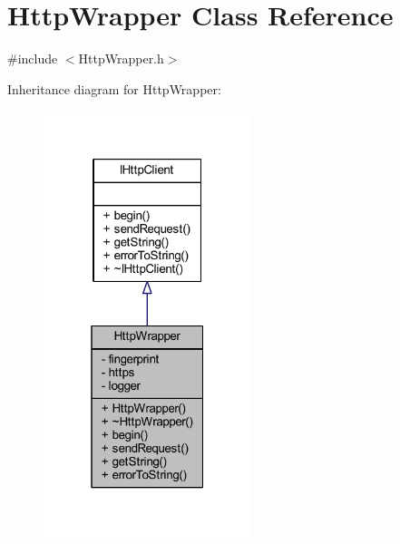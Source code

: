 \hypertarget{class_http_wrapper}{}\section{Http\+Wrapper Class Reference}
\label{class_http_wrapper}


{\ttfamily \#include $<$Http\+Wrapper.\+h$>$}



Inheritance diagram for Http\+Wrapper\+:
\nopagebreak
\begin{figure}[H]
\begin{center}
\leavevmode
\includegraphics[width=172pt]{class_http_wrapper__inherit__graph}
\end{center}
\end{figure}


